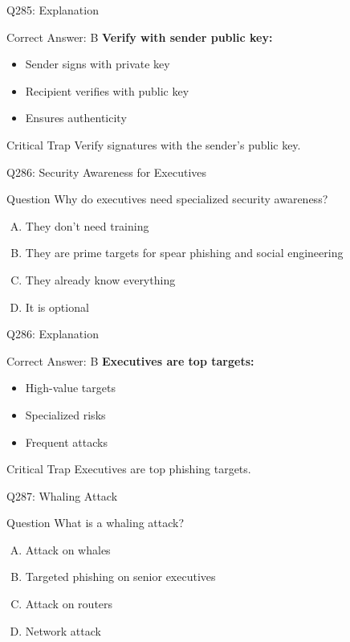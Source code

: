 \documentclass{beamer}
\begin{document}
	\begin{frame}{Q285: Explanation}
		\begin{block}{Correct Answer: B}
			\textbf{Verify with sender public key:}
			\begin{itemize}
				\item Sender signs with private key
				\item Recipient verifies with public key
				\item Ensures authenticity
			\end{itemize}
		\end{block}
		\begin{alertblock}{Critical Trap}
			Verify signatures with the sender's public key.
		\end{alertblock}
	\end{frame}
	
	\begin{frame}{Q286: Security Awareness for Executives}
		\begin{block}{Question}
			Why do executives need specialized security awareness?
		\end{block}
		\begin{enumerate}[(A)]
			\item They don't need training
			\item They are prime targets for spear phishing and social engineering
			\item They already know everything
			\item It is optional
		\end{enumerate}
	\end{frame}
	
	\begin{frame}{Q286: Explanation}
		\begin{block}{Correct Answer: B}
			\textbf{Executives are top targets:}
			\begin{itemize}
				\item High-value targets
				\item Specialized risks
				\item Frequent attacks
			\end{itemize}
		\end{block}
		\begin{alertblock}{Critical Trap}
			Executives are top phishing targets.
		\end{alertblock}
	\end{frame}
	
	\begin{frame}{Q287: Whaling Attack}
		\begin{block}{Question}
			What is a whaling attack?
		\end{block}
		\begin{enumerate}[(A)]
			\item Attack on whales
			\item Targeted phishing on senior executives
			\item Attack on routers
			\item Network attack
		\end{enumerate}
	\end{frame}
	
\end{document}
